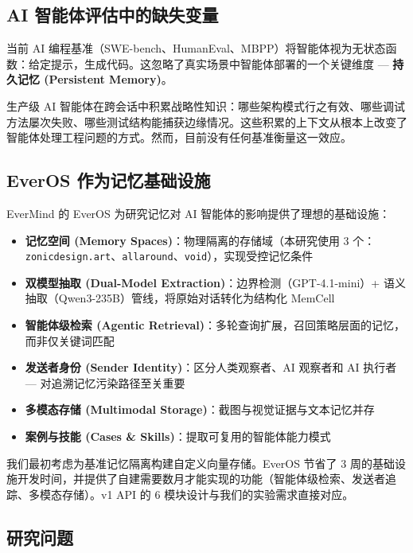 \documentclass[11pt, a4paper]{article}
\begin{document}
\subsection{AI 智能体评估中的缺失变量}

当前 AI 编程基准（SWE-bench、HumanEval、MBPP）将智能体视为无状态函数：给定提示，生成代码。这忽略了真实场景中智能体部署的一个关键维度 --- \textbf{持久记忆 (Persistent Memory)}。

生产级 AI 智能体在跨会话中积累战略性知识：哪些架构模式行之有效、哪些调试方法屡次失败、哪些测试结构能捕获边缘情况。这些积累的上下文从根本上改变了智能体处理工程问题的方式。然而，目前没有任何基准衡量这一效应。

\subsection{EverOS 作为记忆基础设施}

EverMind 的 EverOS 为研究记忆对 AI 智能体的影响提供了理想的基础设施：

\begin{itemize}
  \item \textbf{记忆空间 (Memory Spaces)}：物理隔离的存储域（本研究使用 3 个：\texttt{zonicdesign.art}、\texttt{allaround}、\texttt{void}），实现受控记忆条件
  \item \textbf{双模型抽取 (Dual-Model Extraction)}：边界检测（GPT-4.1-mini）+ 语义抽取（Qwen3-235B）管线，将原始对话转化为结构化 MemCell
  \item \textbf{智能体级检索 (Agentic Retrieval)}：多轮查询扩展，召回策略层面的记忆，而非仅关键词匹配
  \item \textbf{发送者身份 (Sender Identity)}：区分人类观察者、AI 观察者和 AI 执行者 --- 对追溯记忆污染路径至关重要
  \item \textbf{多模态存储 (Multimodal Storage)}：截图与视觉证据与文本记忆并存
  \item \textbf{案例与技能 (Cases \& Skills)}：提取可复用的智能体能力模式
\end{itemize}

\begin{evidence}
我们最初考虑为基准记忆隔离构建自定义向量存储。EverOS 节省了 3 周的基础设施开发时间，并提供了自建需要数月才能实现的功能（智能体级检索、发送者追踪、多模态存储）。v1 API 的 6 模块设计与我们的实验需求直接对应。
\end{evidence}

\subsection{研究问题}
\end{document}
